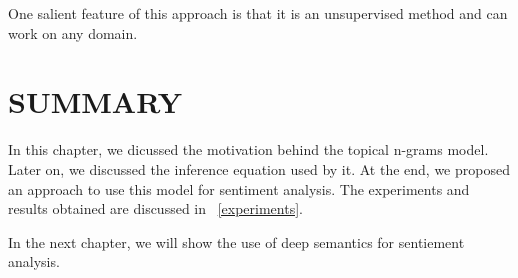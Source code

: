 One salient feature of this approach is that it is an unsupervised method and can work on any domain. 

\section*{SUMMARY}

In this chapter, we dicussed the motivation behind the topical n-grams model. Later on, we discussed the inference equation used by it. At the end,
we proposed an approach to use this model for sentiment analysis. The experiments and results obtained are discussed in ~\cref{experiments}.

In the next chapter, we will show the use of deep semantics for sentiement analysis.